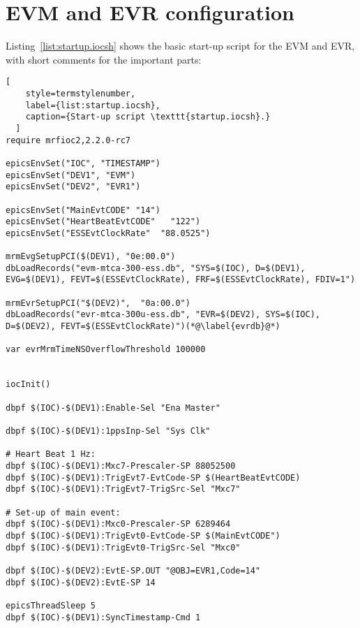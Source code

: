 \documentclass[11pt
  , a4paper
  , article
  , oneside
  , showtrims
]{memoir}
\begin{document}
\section{EVM and EVR configuration}
Listing~\ref{list:startup.iocsh} shows the basic start-up script for the EVM and EVR, with short comments for the important parts:
\begin{lstlisting}[
    style=termstylenumber,
    label={list:startup.iocsh},
    caption={Start-up script \texttt{startup.iocsh}.}
  ]
require mrfioc2,2.2.0-rc7

epicsEnvSet("IOC", "TIMESTAMP")
epicsEnvSet("DEV1", "EVM")
epicsEnvSet("DEV2", "EVR1")

epicsEnvSet("MainEvtCODE" "14")
epicsEnvSet("HeartBeatEvtCODE"   "122")
epicsEnvSet("ESSEvtClockRate"  "88.0525")

mrmEvgSetupPCI($(DEV1), "0e:00.0")
dbLoadRecords("evm-mtca-300-ess.db", "SYS=$(IOC), D=$(DEV1), EVG=$(DEV1), FEVT=$(ESSEvtClockRate), FRF=$(ESSEvtClockRate), FDIV=1")

mrmEvrSetupPCI("$(DEV2)",  "0a:00.0")
dbLoadRecords("evr-mtca-300u-ess.db", "EVR=$(DEV2), SYS=$(IOC), D=$(DEV2), FEVT=$(ESSEvtClockRate)")(*@\label{evrdb}@*)

var evrMrmTimeNSOverflowThreshold 100000


iocInit()

dbpf $(IOC)-$(DEV1):Enable-Sel "Ena Master"

dbpf $(IOC)-$(DEV1):1ppsInp-Sel "Sys Clk"

# Heart Beat 1 Hz:
dbpf $(IOC)-$(DEV1):Mxc7-Prescaler-SP 88052500
dbpf $(IOC)-$(DEV1):TrigEvt7-EvtCode-SP $(HeartBeatEvtCODE)
dbpf $(IOC)-$(DEV1):TrigEvt7-TrigSrc-Sel "Mxc7"

# Set-up of main event:
dbpf $(IOC)-$(DEV1):Mxc0-Prescaler-SP 6289464
dbpf $(IOC)-$(DEV1):TrigEvt0-EvtCode-SP $(MainEvtCODE")
dbpf $(IOC)-$(DEV1):TrigEvt0-TrigSrc-Sel "Mxc0"

dbpf $(IOC)-$(DEV2):EvtE-SP.OUT "@OBJ=EVR1,Code=14"
dbpf $(IOC)-$(DEV2):EvtE-SP 14

epicsThreadSleep 5
dbpf $(IOC)-$(DEV1):SyncTimestamp-Cmd 1
\end{lstlisting}
\end{document}
